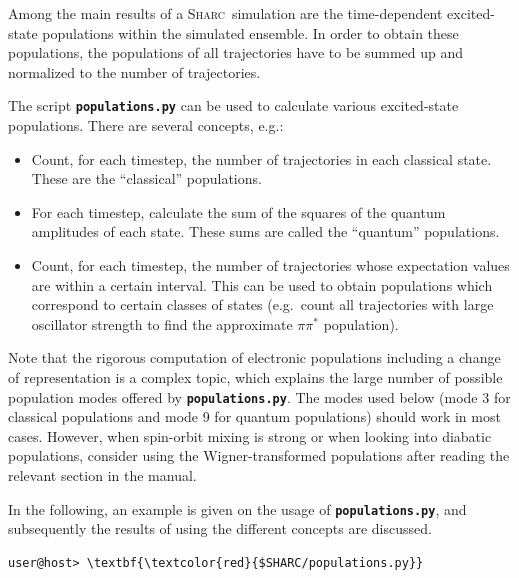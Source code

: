 \documentclass[a4paper,11pt,DIV=15,openany]{scrbook}
\newcommand{\sharc}{\textsc{Sharc}}
\newcommand{\ttt}[1]{\textbf{\texttt{#1}}}
\begin{document}
Among the main results of a \sharc\ simulation are the time-dependent excited-state populations within the simulated ensemble. 
In order to obtain these populations, the populations of all trajectories have to be summed up and normalized to the number of trajectories.

The script \ttt{populations.py} can be used to calculate various excited-state populations. There are several concepts, e.g.:
\begin{itemize}
  \item Count, for each timestep, the number of trajectories in each classical state. These are the ``classical'' populations. 
  \item For each timestep, calculate the sum of the squares of the quantum amplitudes of each state. These sums are called the ``quantum'' populations.
  \item Count, for each timestep, the number of trajectories whose expectation values are within a certain interval. This can be used to obtain populations which correspond to certain classes of states (e.g.\ count all trajectories with large oscillator strength to find the approximate $\pi\pi^*$ population).
\end{itemize}

Note that the rigorous computation of electronic populations including a change of representation is a complex topic, which explains the large number of possible population modes offered by \ttt{populations.py}.
The modes used below (mode 3 for classical populations and mode 9 for quantum populations) should work in most cases.
However, when spin-orbit mixing is strong or when looking into diabatic populations, consider using the Wigner-transformed populations after reading the relevant section in the manual.

In the following, an example is given on the usage of \ttt{populations.py}, and subsequently the results of using the different concepts are discussed.
\begin{Verbatim}[commandchars=\\\{\}]
user@host> \textbf{\textcolor{red}{$SHARC/populations.py}}
\end{Verbatim}
\end{document}
